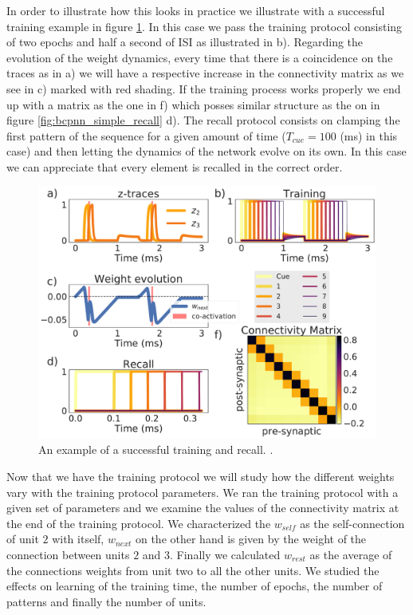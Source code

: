 \documentclass[10pt,a4paper]{article}
\begin{document}
In order to illustrate how this looks in practice we illustrate with a successful training example in figure \ref{fig:bcpnn_simple_training_and_recall}. In this case we pass the training protocol consisting of two epochs and half a second of ISI as illustrated in b). Regarding the evolution of the weight dynamics, every time that there is a coincidence on the traces as in a) we will have a respective increase in the connectivity matrix as we see in c) marked with red shading. If the training process works properly we end up with a matrix as the one in f) which posses similar structure as the on in figure \ref{fig:bcpnn_simple_recall} d). The recall protocol consists on clamping the first pattern of the sequence for a given amount of time ($T_{cue}=100$ (ms) in this case) and then letting the dynamics of the network evolve on its own. In this case we can appreciate that every element is recalled in the correct order.

\begin{figure}[H]
\centering
\includegraphics[scale=0.30]{bcpnn_learning_and_recall.pdf}
\caption{An example of a successful training and recall. .}
\label{fig:bcpnn_simple_training_and_recall}

\end{figure}

Now that we have the training protocol we will study how the different weights vary with the training protocol parameters. We ran the training protocol with a given set of parameters and we examine the values of the connectivity matrix at the end of the training protocol. We characterized the $w_{self}$ as the self-connection of unit $2$ with itself, $w_{next}$ on the other hand is given by the weight of the connection between units $2$ and $3$. Finally we calculated $w_{rest}$ as the average of the connections weights from unit two to all the other units. We studied the effects on learning of the training time, the number of epochs, the number of patterns and finally the number of units.
\end{document}

